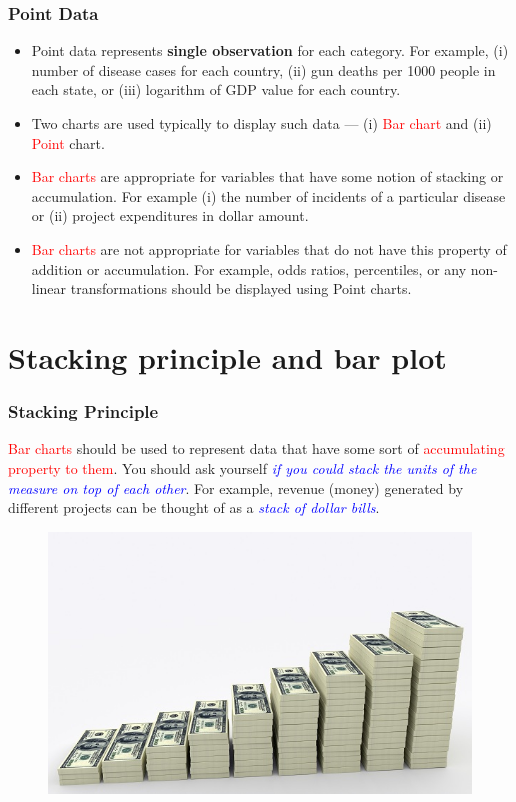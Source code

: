 \documentclass{beamer}
\begin{document}
\begin{frame}\frametitle{Point Data}
\small
\begin{itemize}
\item Point data represents \textbf{single observation} for each category. For example, (i) number of disease cases for each country, (ii) gun deaths per 1000 people in each state, or (iii) logarithm of GDP value for each country.
\item<2-> Two charts are used typically to display such data --- (i) \textcolor{red}{Bar chart} and (ii) \textcolor{red}{Point} chart.
\item<3->  \textcolor{red}{Bar charts} are appropriate for variables that have some notion of stacking or accumulation. For example (i) the number of incidents of a particular disease or (ii) project expenditures in dollar amount.
\item<4-> \textcolor{red}{Bar charts} are not appropriate for variables that do not have this property of addition or accumulation. For example, odds ratios, percentiles, or any non-linear transformations should be displayed using Point charts.  
\end{itemize}
\end{frame}

\section{Stacking principle and bar plot}
\begin{frame}\frametitle{Stacking Principle}
\small
\textcolor{red}{Bar charts} should be used to represent data that have some sort of \textcolor{red}{accumulating property to them}. You should ask yourself \textit{\textcolor{blue}{if you could stack the units of the measure on top of each other}}. For example, revenue (money) generated by different projects can be thought of as a \textit{\textcolor{blue}{stack of dollar bills}}. 
\begin{figure}
\includegraphics[width=0.80\linewidth]{PlotsLec1/money_stack}
\end{figure}
\end{frame}
\end{document}

